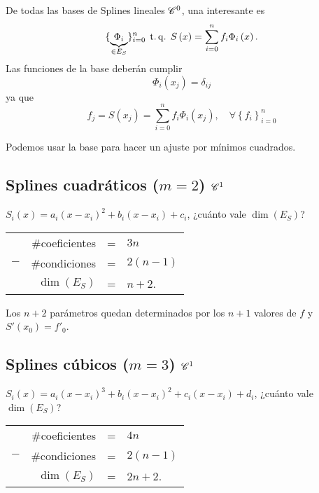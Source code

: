 De todas las bases de Splines lineales $\mathscr{C}^0$, una interesante es
\[
    \{ \underbrace{\Phi_i}_{\in E_S} \}_{i=0}^n \operatorname{\;t.q.\;} S\left( x \right) = \sum_{i=0}^n f_i\Phi_i\left( x \right).
\]
Las funciones de la base deberán cumplir
\[
    \Phi_i\left( x_j \right) = \delta_{ij}
\]
ya que
\[
    f_j = S\left( x_j \right) = \sum_{i=0}^n f_i\Phi_i\left( x_j \right),\quad \forall \left\{ f_i \right\}_{i=0}^n
\]

\begin{obs}
    Podemos usar la base para hacer un ajuste por mínimos cuadrados.
\end{obs}

\subsection{Splines cuadráticos ($m=2$) $\mathscr{C}^1$}

$S_i\left( x \right) = a_i\left( x-x_i \right)^2 + b_i \left( x-x_i \right) + c_i$, ¿cuánto vale $\dim\left( E_S \right)$?

\begin{center}
    \begin{tabular}{crcl}
        & $\#$coeficientes &=& $3n$\\
        $-$ & $\#$condiciones &=& $2\left( n-1\right)$\\\hline
        &$\dim\left( E_S \right)$ &=& $n+2$.
    \end{tabular}
\end{center}

Los $n+2$ parámetros quedan determinados por los $n+1$ valores de $f$ y $S'\left( x_0 \right) = f'_0$.

\subsection{Splines cúbicos ($m=3$) $\mathscr{C}^1$}

$S_i\left( x \right) = a_i\left( x-x_i \right)^3 + b_i \left( x-x_i \right)^2 + c_i\left( x-x_i \right) + d_i$, ¿cuánto vale $\dim\left( E_S \right)$?

\begin{center}
    \begin{tabular}{crcl}
        & $\#$coeficientes &=& $4n$\\
        $-$ & $\#$condiciones &=& $2\left( n-1\right)$\\\hline
        &$\dim\left( E_S \right)$ &=& $2n+2$.
    \end{tabular}
\end{center}

